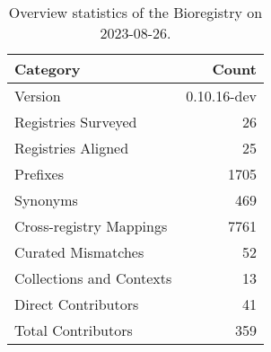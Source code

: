 \begin{table}
\caption{Overview statistics of the Bioregistry on 2023-08-26.}
\label{tab:bioregistry-summary}
\begin{tabular}{lr}
\toprule
Category & Count \\
\midrule
Version & 0.10.16-dev \\
Registries Surveyed & 26 \\
Registries Aligned & 25 \\
Prefixes & 1705 \\
Synonyms & 469 \\
Cross-registry Mappings & 7761 \\
Curated Mismatches & 52 \\
Collections and Contexts & 13 \\
Direct Contributors & 41 \\
Total Contributors & 359 \\
\bottomrule
\end{tabular}
\end{table}
